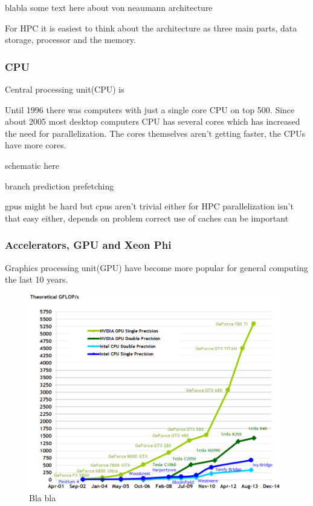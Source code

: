 \documentclass[10pt,a4paper]{article}
\begin{document}
blabla some text here about von neaumann architecture

For HPC it is easiest to think about the architecture as three main parts, data storage, processor and the memory.\cite{intro_hpc}

\subsubsection{CPU}
Central processing unit(CPU) is \cite{introduction_hpc_hager}

Until 1996 there was computers with just a single core CPU on top 500\cite{TOP500}. Since about 2005 most desktop computers CPU has several cores which has increased the need for parallelization. The cores themselves aren't getting faster, the CPUs have more cores.

schematic here

branch prediction
prefetching

gpus might be hard but cpus aren't trivial either for HPC
parallelization isn't that easy either, depends on problem
correct use of caches can be important\cite{drepper2007cpumemory}

\subsubsection{Accelerators, GPU and Xeon Phi}
Graphics processing unit(GPU) have become more popular for general computing the last 10 years.

\begin{figure}[h]
    \centering
    \includegraphics[width=11cm]{floating-point-operations-per-second.png}
    \caption{Bla bla \cite{cuda}}
    \label{fig:gpu_vs_cpu}
\end{figure}
\end{document}

